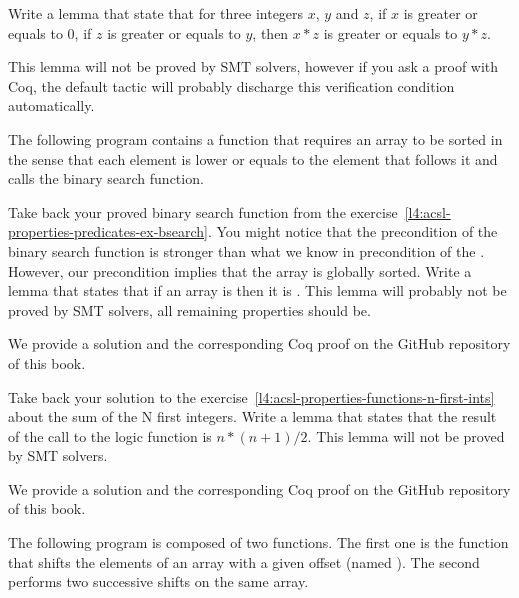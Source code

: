 


Write a lemma that state that for three integers $x$, $y$ and $z$, if $x$ is
greater or equals to $0$, if $z$ is greater or equals to $y$, then $x * z$ is
greater or equals to $y * z$.


This lemma will not be proved by SMT solvers, however if you ask a proof with
Coq, the default tactic will probably discharge this verification condition
automatically.


\label{l4:acsl-properties-lemmas-lsorted-gsorted}


The following program contains a function that requires an array to be sorted
in the sense that each element is lower or equals to the element that follows it
and calls the binary search function.




Take back your proved binary search function from the
exercise~\ref{l4:acsl-properties-predicates-ex-bsearch}. You might notice that
the precondition of the binary search function is stronger than what we know in
precondition of the . However, our precondition
implies that the array is globally sorted. Write a lemma that states that if
an array is  then it is .
This lemma will probably not be proved by SMT solvers, all remaining properties
should be.

We provide a solution and the corresponding Coq proof on the GitHub repository
of this book.


\label{l4:acsl-properties-lemmas-n-first-ints}

Take back your solution to the
exercise~\ref{l4:acsl-properties-functions-n-first-ints} about the sum of the
N first integers. Write a lemma that states that the result of the call to the
logic function is $n*(n+1)/2$. This lemma will not be proved by SMT solvers.


We provide a solution and the corresponding Coq proof on the GitHub repository
of this book.


\label{l4:acsl-properties-lemmas-shift-trans}


The following program is composed of two functions. The first one is the
 function that shifts the elements of an array with a
given offset (named ). The second performs two successive
shifts on the same array.



